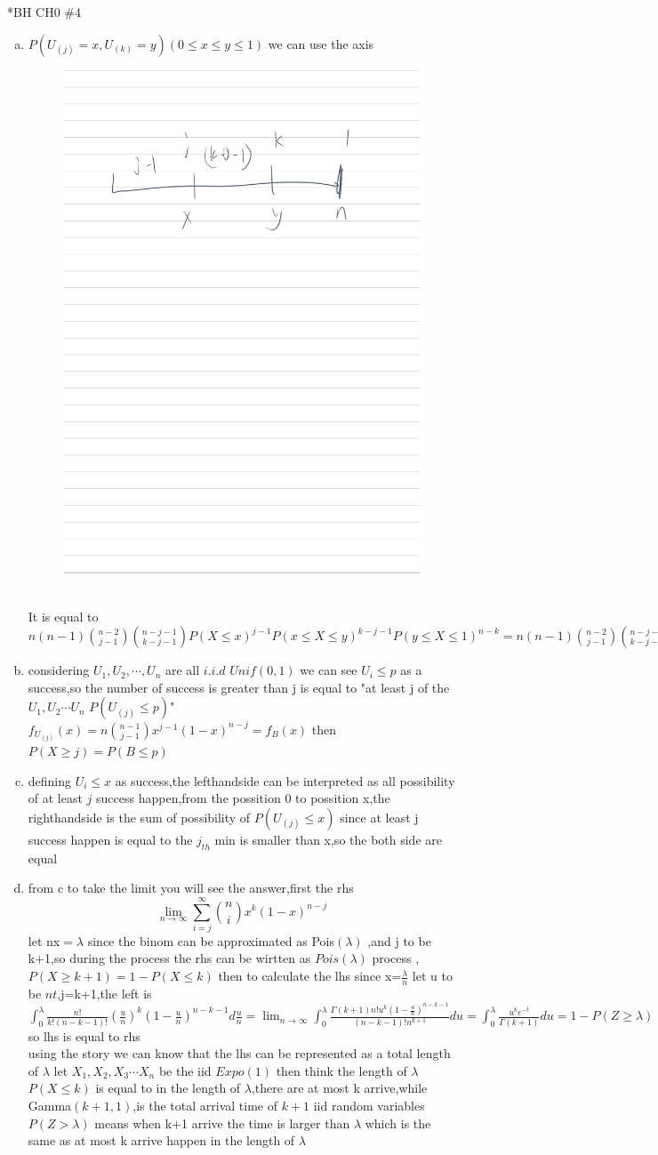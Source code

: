 \documentclass{article}
\begin{document}
\begin{homeworkProblem}*{BH CH0 \#4}
	\begin{enumerate}[(a)]
\item $P(U_{(j)}=x,U_{(k)}=y)(0\leq x\leq y\leq 1)$ we can use the axis
\begin{figure}[htbp]
	\includegraphics[width=0.5\linewidth,height=0.3\linewidth]{p4.png}
\end{figure}
\\It is equal to $n(n-1)\binom{n-2}{j-1}\binom{n-j-1}{k-j-1}P(X\leq x)^{j-1}P(x\leq X\leq y)^{k-j-1}P(y\leq X\leq 1)^{n-k}=n(n-1)\binom{n-2}{j-1}\binom{n-j-1}{k-j-1}x^{j-1}(y-x)^{k-j-1}(1-y)^{n-k}$
\item considering $U_1,U_2,\cdots,U_n$ are all $i.i.d$ $Unif(0,1)$ we can see $U_i\leq p$ as a success,so the number of success is greater than j is equal to "at least j of the $U_1,U_2\cdots U_n$  $P(U_(j)\leq p)$" $f_{U_{(j)}}(x)=n\binom{n-1}{j-1}x^{j-1}(1-x)^{n-j}=f_{B}(x)$	
then $P(X\geq j)=P(B\leq p)$
\item defining $U_i\leq x$ as success,the lefthandside can be interpreted as all possibility of at least $j$ success happen,from the possition 0 to possition x,the righthandside is the sum of possibility of $P(U_(j)\leq x)$ since at least j success happen is equal to the $j_{th}$ min is smaller than x,so the both side are equal 
\item from c to take the limit you will see the answer,first the rhs $${\lim_{n\to \infty}\sum_{i=j}^{\infty}\binom{n}{i}}x^{k}(1-x)^{n-j}$$ let nx$=\lambda$ since the binom can be approximated as Pois$(\lambda)$ ,and j to be k+1,so during the process the rhs can be wirtten as $Pois(\lambda)$ process ,$P(X\geq k+1)=1-P(X\leq k)$   
then to calculate the lhs since x=$\frac{\lambda}{n}$ let u to be $nt$,j=k+1,the left is $\int_{0}^{\lambda}\frac{n!}{k!(n-k-1)!}(\frac{u}{n})^{k}(1-\frac{u}{n})^{n-k-1}d\frac{u}{n}=\lim_{n\to \infty}\int_{0}^{\lambda}\frac{\Gamma(k+1)n!u^{k}(1-\frac{u}{n})^{n-k-1}}{(n-k-1)!n^{k+1}}du=\int _{0}^{\lambda}\frac{u^{k}e^{-t}}{\Gamma(k+1)}du=1-P(Z\geq \lambda)$
so lhs is equal to rhs
\\using the story we can know that the lhs can be represented as a total length of $\lambda$  let $X_1,X_2,X_3\cdots X_n$ be the iid $Expo(1)$ then think the length of $\lambda$ $P(X\leq k)$ is equal to in the length of $\lambda$,there are at most k arrive,while Gamma$(k+1,1)$,is the total arrival time of $k+1$ iid random variables $P(Z> \lambda)$ means when k+1 arrive the time is larger than $\lambda$ which is the same as at most k arrive happen in the length of $\lambda$   
\end{enumerate}
\end{homeworkProblem}
\end{document}
